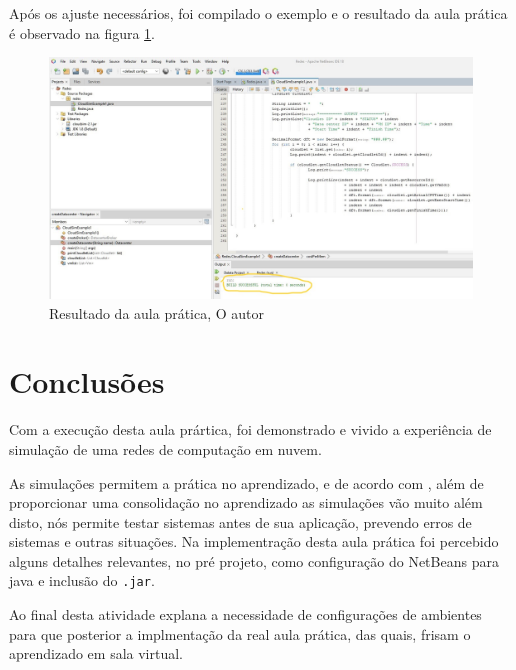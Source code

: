 



\newpage
\par Após os ajuste necessários, foi compilado o exemplo e o resultado da aula prática é observado na figura \ref{fig:result_pratic}.

\begin{figure}[h]
  \center
  \includegraphics[width=\textwidth]{figure/result_pratic.jpg}
  \caption{Resultado da aula prática, O autor}
  \label{fig:result_pratic}
\end{figure}
\section{Conclusões}
\par Com a execução desta aula prártica, foi demonstrado e vivido a experiência de simulação de uma redes de computação em nuvem.
\par As simulações permitem a prática no aprendizado, e de acordo com , além de proporcionar uma consolidação no aprendizado as simulações vão muito além disto, nós permite testar sistemas antes de sua aplicação, prevendo erros de sistemas e outras situações. Na implementração desta aula prática foi percebido alguns detalhes relevantes, no pré projeto, como configuração do NetBeans para java e inclusão do \verb#.jar#.
\par Ao final desta atividade explana a necessidade de configurações de ambientes para que posterior a implmentação da real aula prática, das quais, frisam o aprendizado em sala virtual.






